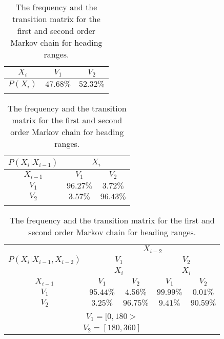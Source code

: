\documentclass[preprint,12pt]{elsarticle}
\begin{document}
\begin{table}[!ht]
\centering
\begin{tabular}{|c|c|c|}
\hline
$X_{i}$ & $V_{1}$ & $V_{2}$\\ \hline
$P(X_{i})$ & $47.68\%$ & $52.32\%$\\ \hline
\multicolumn{3}{c}{}\\
\end{tabular}

\begin{tabular}{|c|c|c|}
\hline
$P(X_{i}|X_{i-1})$ & \multicolumn{2}{|c|}{$X_{i}$}\\ \hline
$X_{i-1}$ & $V_{1}$ & $V_{2}$\\ \hline
$V_{1}$ & $96.27\%$ & $3.72\%$\\ \hline
$V_{2}$ & $3.57\%$ & $96.43\%$\\ \hline
\multicolumn{3}{c}{}\\
\end{tabular}

\begin{tabular}{|c|c|c|c|c|}
\hline
\multirow{3}{*}{$P(X_{i}|X_{i-1},X_{i-2})$} & \multicolumn{4}{|c|}{$X_{i-2}$}\\ \cline{2-5}
 & \multicolumn{2}{|c|}{$V_{1}$} & \multicolumn{2}{|c|}{$V_{2}$}\\ \cline{2-5}
 & \multicolumn{2}{|c|}{$X_{i}$} & \multicolumn{2}{|c|}{$X_{i}$}\\ \hline
$X_{i-1}$ & $V_{1}$ & $V_{2}$ & $V_{1}$ & $V_{2}$\\ \hline
$V_{1}$ & $95.44\%$ & $4.56\%$ & $99.99\%$ & $0.01\%$\\ \hline
$V_{2}$ & $3.25\%$ & $96.75\%$ & $9.41\%$ & $90.59\%$\\ \hline
\multicolumn{5}{c}{}\\
\multicolumn{5}{c}{$V_{1} = [0, 180>$}\\
\multicolumn{5}{c}{$V_{2} = [180, 360]$}\\
\end{tabular}
\caption{The frequency and the transition matrix for the first and second order Markov chain for heading ranges.}
\label{tab:direction}
\end{table}
\end{document}
